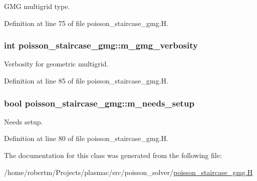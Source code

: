 G\+MG multigrid type. 



Definition at line 75 of file poisson\+\_\+staircase\+\_\+gmg.\+H.

\subsubsection[{\texorpdfstring{m\+\_\+gmg\+\_\+verbosity}{m_gmg_verbosity}}]{\setlength{\rightskip}{0pt plus 5cm}int poisson\+\_\+staircase\+\_\+gmg\+::m\+\_\+gmg\+\_\+verbosity\hspace{0.3cm}{\ttfamily [protected]}}\hypertarget{classpoisson__staircase__gmg_ab584ed696824702de480e2cb9fd11eb1}{}\label{classpoisson__staircase__gmg_ab584ed696824702de480e2cb9fd11eb1}


Verbosity for geometric multigrid. 



Definition at line 85 of file poisson\+\_\+staircase\+\_\+gmg.\+H.

\subsubsection[{\texorpdfstring{m\+\_\+needs\+\_\+setup}{m_needs_setup}}]{\setlength{\rightskip}{0pt plus 5cm}bool poisson\+\_\+staircase\+\_\+gmg\+::m\+\_\+needs\+\_\+setup\hspace{0.3cm}{\ttfamily [protected]}}\hypertarget{classpoisson__staircase__gmg_a9516ac18769fabd57336395b1edac878}{}\label{classpoisson__staircase__gmg_a9516ac18769fabd57336395b1edac878}


Needs setup. 



Definition at line 80 of file poisson\+\_\+staircase\+\_\+gmg.\+H.



The documentation for this class was generated from the following file\+:\begin{DoxyCompactItemize}
\item 
/home/robertm/\+Projects/plasmac/src/poisson\+\_\+solver/\hyperlink{poisson__staircase__gmg_8H}{poisson\+\_\+staircase\+\_\+gmg.\+H}\end{DoxyCompactItemize}
